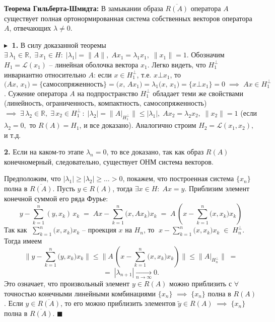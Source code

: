 \textbf{Теорема Гильберта-Шмидта:\;} В замыкании образа $\overline{R(A)}$ оператора $A$ существует полная ортонормированная система собственных векторов оператора $A$, отвечающих $\lambda \ne 0$.

$\blacktriangleright\;$ 
\textbf{1.} В силу доказанной теоремы $\exists \,\lambda_1 \in \mathbb{R}, \;\exists\,x_1\in H: \; |\lambda_1| = \|A\|, \; A x_1 = \lambda_1 x_1, \; \|x_1\| = 1$. 
Обозначим $H_1 = \mathcal{L} (x_1)$ -- линейная оболочка вектора $x_1$. Легко видеть, что $H_1^\bot$ инвариантно относительно $A$: если $x \in H_1^\bot$, т.е. $x\bot x_1$, то $\displaystyle \big(A x,\,x_1\big) = \{\textit{самосопряженность}\}=\big(x,\, A x_1\big) = \lambda_1 \big(x,\,x_1\big) = \{ x\bot x_1\} = 0 \;\implies\; A x \in H_1^\bot$. 
Сужение оператора $A$ на подпространство $H_1^\bot$ обладает теми же свойствами (линейность, ограниченность, компактность, самосопряженность) $\implies \; \exists \, \lambda_2 \in \mathbb{R}, \; \exists\,x_2 \in H_1^{\bot} \,: \; |\lambda_2| = \big\|A\big|_{H_1^\bot}\big\| \leq |\lambda_1|, \; Ax_2 = \lambda_2 x_2, \; \|x_2\| = 1$ (если $\lambda_2 = 0,$ то $R(A) = H_1$, и все доказано). Аналогично строим $H_2 = \mathcal{L}(x_1, x_2), $  и т.д.

\textbf{2.} Если на каком-то этапе $\lambda_n = 0$, то все доказано, так как образ $R(A)$ конечномерный, следовательно, существует ОНМ система векторов.

Предположим, что $|\lambda_1| \geq |\lambda_2| \geq\ldots> 0$, покажем, что построенная система $\{x_n\}$ полна в $\overline{R(A)}$. Пусть $y \in R(A)$, тогда $\exists x \in H: \; A x = y$. Приблизим элемент конечной суммой его ряда Фурье: 
$$
y - \sum\limits_{k=1}^n (y, x_k) \, x_k \;=\; A x - \sum\limits_{k=1}^n \big(x, A x_k\big) x_k\; =\; A \,\left(x - \sum\limits_{k=1}^n \big(x, x_k\big) x_k \right)
$$
Так как $\displaystyle\;\sum\limits_{k=1}^n \big(x, x_k\big) x_k$ -- проекция $x$ на $H_n$, то $\;\displaystyle x - \sum\limits_{k=1}^n \big(x, x_k\big) x_k \;\in\; H_n^\bot $. Тогда имеем 
$$
\bigg\| y - \sum\limits_{k=1}^n \big(y, x_k\big) x_k  \bigg\| \leq \bigg\| A \,\left(x - \sum\limits_{k=1}^n \big(x, x_k\big) x_k \right) \bigg\| \leq \big\|A\big|_{H_n^\bot}\big\| \;=$$
$$ =\; |\lambda_{n+1}| \xrightarrow[n\to\infty]{} 0.
$$
Это означает, что произвольный элемент $y\in R(A)$ можно приблизить с $\forall$ точностью конечными линейными комбинациями $\{x_n\}$ $\implies \;\{x_n\}$ полна в $R(A)$. Если $y \in \overline{R(A)}$, то его можно приблизить элементов $\widetilde{y} \in R(A)\; \implies \; \{x_n\}$\; полна в $\overline{R(A)}$. \; $\blacksquare$

